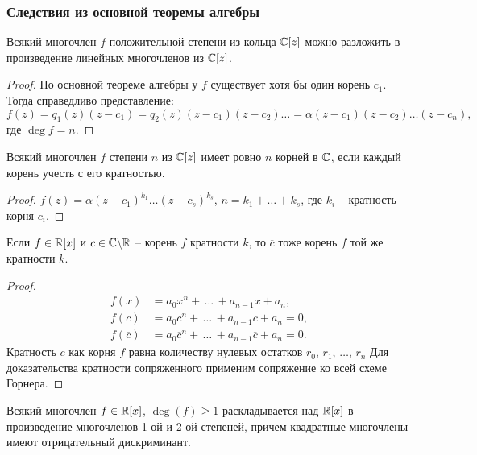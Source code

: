 \subsubsection{Следствия из основной теоремы алгебры}

\begin{corollary}
    Всякий многочлен $f$ положительной степени из кольца $\mathbb{C}[z]$ можно разложить в произведение 
    линейных многочленов из $\mathbb{C}[z]$.
\end{corollary}

\begin{proof}
    По основной теореме алгебры у $f$ существует хотя бы один корень $c_1$. Тогда справедливо представление: 
    $$f(z) = q_1(z) (z - c_1) = q_2(z)(z - c_1)(z - c_2) \dots = \alpha (z - c_1)(z - c_2) \dots (z - c_n),$$ 
    где $\deg f = n$.
\end{proof}

\begin{corollary}
    Всякий многочлен $f$ степени $n$ из $\mathbb{C}[z]$ имеет ровно $n$ корней в $\mathbb{C}$, если каждый корень 
    учесть с его кратностью.
\end{corollary}

\begin{proof}
    $f(z) = \alpha(z-c_1)^{k_1}\dots(z - c_s)^{k_s}$, $n = k_1 + \dots + k_s$, где $k_i$ -- кратность корня $c_i$.
\end{proof}

\begin{corollary}
    Если $f \in \mathbb{R}[x]$ и $c \in \mathbb{C} \backslash \mathbb{R}$ -- корень $f$ кратности $k$, то $\overline{c}$ тоже корень $f$ той же кратности $k$.
\end{corollary}

\begin{proof}
    \begin{align*}
        f(x) & = a_0 x^n + \, \dots \, + a_{n-1} x + a_n, \\
        f(c) & = a_0 c^n + \, \dots \, + a_{n-1} c + a_n = 0, \\
        f(\overline{c}) & = a_0 \overline{c}^n + \, \dots \, + a_{n-1} \overline{c} + a_n = 0.
    \end{align*}
    Кратность $c$ как корня $f$ равна количеству нулевых остатков $r_0$, $r_1$, $\dots$, $r_n$
    Для доказательства кратности сопряженного применим сопряжение ко всей схеме Горнера.
\end{proof}

\begin{corollary}
    Всякий многочлен $f \in \mathbb{R}[x]$, $\deg(f) \geq 1$ раскладывается над $\mathbb{R}[x]$ в произведение многочленов
    1-ой и 2-ой степеней, причем квадратные многочлены имеют отрицательный дискриминант.
\end{corollary}

